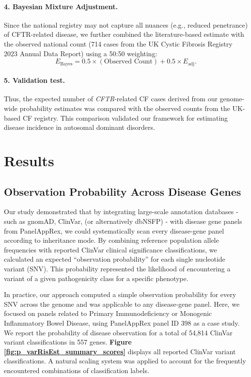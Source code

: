 \paragraph{4. Bayesian Mixture Adjustment.}
Since the national registry may not capture all nuances (e.g., reduced penetrance) of CFTR-related disease, we further combined the literature-based estimate with the observed national count (714 cases from the UK Cystic Fibrosis Registry 2023 Annual Data Report) using a 50:50 weighting:
\[
E_{\text{Bayes}} = 0.5 \times (\text{Observed Count}) + 0.5 \times E_{\text{adj}}.
\]

\paragraph{5. Validation test.}
Thus, the expected number of \textit{CFTR}-related CF cases derived from our genome-wide probability estimates was compared with the observed counts from the UK-based CF registry. This comparison validated our framework for estimating disease incidence in autosomal dominant disorders.

\section{Results}

\subsection{Observation Probability Across Disease Genes}

Our study demonstrated that by integrating large-scale annotation databases -such as gnomAD, ClinVar, (or alternatively dbNSFP) - with disease gene panels from PanelAppRex, we could systematically scan every disease-gene panel according to inheritance mode. By combining reference population allele frequencies with reported ClinVar clinical significance classifications, we calculated an expected ``observation probability'' for each single nucleotide variant (SNV). This probability represented the likelihood of encountering a variant of a given pathogenicity class for a specific phenotype.

In practice, our approach computed a simple observation probability for every SNV across the genome and was applicable to any disease-gene panel. Here, we focused on panels related to Primary Immunodeficiency or Monogenic Inflammatory Bowel Disease, using PanelAppRex panel ID 398 as a case study.
We report the probability of disease observation for a total of 54,814 ClinVar variant classifications in 557 genes. 
\textbf{Figure \ref{fig:p_varRisEst_summary_scores}} displays all reported ClinVar  variant classifications. A natural scaling system was applied to account for the frequently encountered combinations of classification labels.

